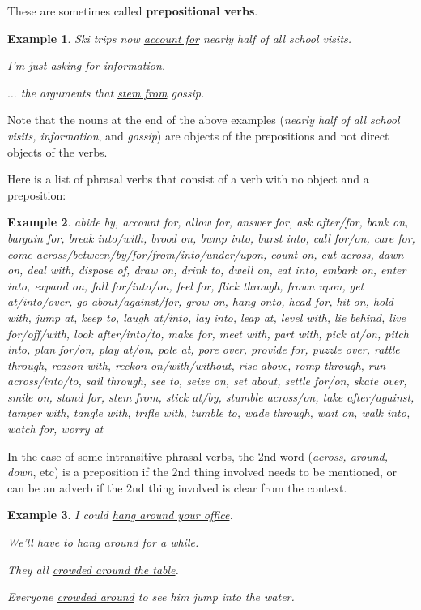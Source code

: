 \documentclass[oneside]{book}
\numberwithin{equation}{section}
\newtheorem{example}{Example}[section]
\begin{document}
These are sometimes called \textbf{prepositional verbs}.
\begin{example}
    Ski trips now \underline{account for} nearly half of all school visits.
    
    I\underline{'m} just \underline{asking for} information.
    
    $\ldots$ the arguments that \underline{stem from} gossip.
\end{example}
Note that the nouns at the end of the above examples (\textit{nearly half of all school visits, information}, and \textit{gossip}) are objects of the prepositions and not direct objects of the verbs.

%
\noindent{} Here is a list of phrasal verbs that consist of a verb with no object and a preposition:
\begin{example}
    abide by, account for, allow for, answer for, ask after/for, bank on, bargain for, break into/with, brood on, bump into, burst into, call for/on, care for, come across/between/by/for/from/into/under/upon, count on, cut across, dawn on, deal with, dispose of, draw on, drink to, dwell on, eat into, embark on, enter into, expand on, fall for/into/on, feel for, flick through, frown upon, get at/into/over, go about/against/for, grow on, hang onto, head for, hit on, hold with, jump at, keep to, laugh at/into, lay into, leap at, level with, lie behind, live for/off/with, look after/into/to, make for, meet with, part with, pick at/on, pitch into, plan for/on, play at/on, pole at, pore over, provide for, puzzle over, rattle through, reason with, reckon on/with/without, rise above, romp through, run across/into/to, sail through, see to, seize on, set about, settle for/on, skate over, smile on, stand for, stem from, stick at/by, stumble across/on, take after/against, tamper with, tangle with, trifle with, tumble to, wade through, wait on, walk into, watch for, worry at
\end{example}
%
\noindent{} In the case of some intransitive phrasal verbs, the 2nd word (\textit{across, around, down}, etc) is a preposition if the 2nd thing involved needs to be mentioned, or can be an adverb if the 2nd thing involved is clear from the context.
\begin{example}
    I could \underline{hang around your office}.
    
    We'll have to \underline{hang around} for a while.
    
    They all \underline{crowded around the table}.
    
    Everyone \underline{crowded around} to see him jump into the water.
\end{example}
\end{document}

